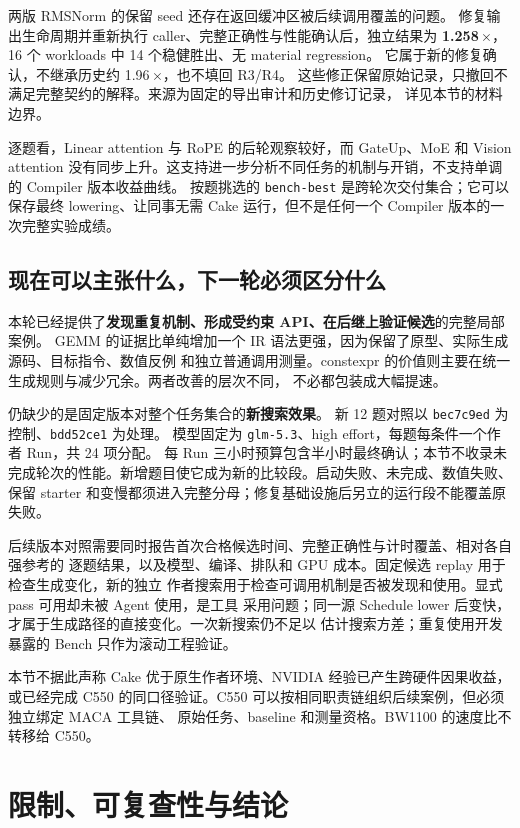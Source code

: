 \documentclass[UTF8,11pt,a4paper,fontset=none]{ctexart}
\newcommand{\code}[1]{\texttt{#1}}
\begin{document}
两版 RMSNorm 的保留 seed 还存在返回缓冲区被后续调用覆盖的问题。
修复输出生命周期并重新执行 caller、完整正确性与性能确认后，独立结果为
\textbf{1.258\,$\times$}，16 个 workloads 中 14 个稳健胜出、无 material regression。
它属于新的修复确认，不继承历史约 1.96\,$\times$，也不填回 R3/R4。
这些修正保留原始记录，只撤回不满足完整契约的解释。来源为固定的导出审计和历史修订记录，
详见本节的材料边界\cite{bwarchive}。

逐题看，Linear attention 与 RoPE 的后轮观察较好，而 GateUp、MoE 和 Vision attention
没有同步上升。这支持进一步分析不同任务的机制与开销，不支持单调的 Compiler 版本收益曲线。
按题挑选的 \code{bench-best} 是跨轮次交付集合；它可以保存最终 lowering、让同事无需 Cake
运行，但不是任何一个 Compiler 版本的一次完整实验成绩。
\FloatBarrier

\subsection{现在可以主张什么，下一轮必须区分什么}

本轮已经提供了\textbf{发现重复机制、形成受约束 API、在后继上验证候选}的完整局部案例。
GEMM 的证据比单纯增加一个 IR 语法更强，因为保留了原型、实际生成源码、目标指令、数值反例
和独立普通调用测量。constexpr 的价值则主要在统一生成规则与减少冗余。两者改善的层次不同，
不必都包装成大幅提速。

仍缺少的是固定版本对整个任务集合的\textbf{新搜索效果}。
新 12 题对照以 \code{bec7c9ed} 为控制、\code{bdd52ce1} 为处理。
模型固定为 \code{glm-5.3}、high effort，每题每条件一个作者 Run，共 24 项分配。
每 Run 三小时预算包含半小时最终确认；本节不收录未完成轮次的性能。新增题目使它成为新的比较段。启动失败、未完成、数值失败、
保留 starter 和变慢都须进入完整分母；修复基础设施后另立的运行段不能覆盖原失败。

后续版本对照需要同时报告首次合格候选时间、完整正确性与计时覆盖、相对各自强参考的
逐题结果，以及模型、编译、排队和 GPU 成本。固定候选 replay 用于检查生成变化，新的独立
作者搜索用于检查可调用机制是否被发现和使用。显式 pass 可用却未被 Agent 使用，是工具
采用问题；同一源 Schedule lower 后变快，才属于生成路径的直接变化。一次新搜索仍不足以
估计搜索方差；重复使用开发暴露的 Bench 只作为滚动工程验证。

本节不据此声称 Cake 优于原生作者环境、NVIDIA 经验已产生跨硬件因果收益，或已经完成
C550 的同口径验证。C550 可以按相同职责链组织后续案例，但必须独立绑定 MACA 工具链、
原始任务、baseline 和测量资格。BW1100 的速度比不转移给 C550。

\section{限制、可复查性与结论}
\end{document}
